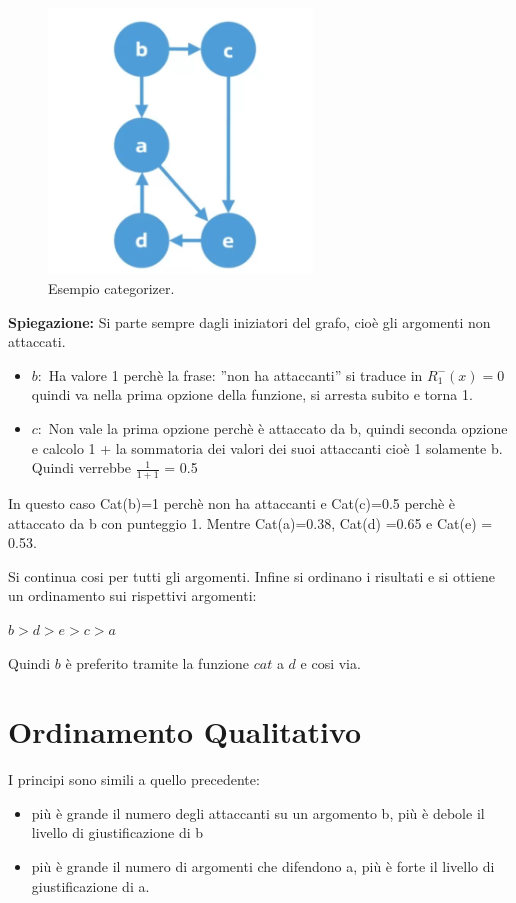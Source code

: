 \begin{figure}[htp]
	\centering
    \includegraphics[width=7cm, keepaspectratio]{img/Cap8/quantitativo2.png}
    \caption{Esempio categorizer.}
\end{figure}
\noindent \textbf{Spiegazione: } Si parte sempre dagli iniziatori del grafo, cioè gli argomenti non attaccati.
\begin{itemize}
    \item $b:$ Ha valore 1 perchè la frase: ”non ha attaccanti” si traduce in $R^-_1(x) = 0$ quindi va nella prima opzione della funzione, si arresta subito e torna 1.
    \item $c:$ Non vale la prima opzione perchè è attaccato da b, quindi seconda opzione e calcolo 1 + la sommatoria dei valori dei suoi attaccanti cioè 1 solamente b. Quindi verrebbe $\frac{1}{1+1}$ = 0.5
\end{itemize}
In questo caso Cat(b)=1 perchè non ha attaccanti e Cat(c)=0.5 perchè è attaccato da b con punteggio 1. Mentre Cat(a)=0.38, Cat(d) =0.65 e Cat(e) = 0.53.

\vspace{0.3cm}

Si continua cosi per tutti gli argomenti. Infine si ordinano i risultati e si ottiene un ordinamento sui rispettivi argomenti:
\begin{center}
    $b>d>e>c>a$
\end{center}
Quindi $b$ è preferito tramite la funzione $cat$ a $d$ e cosi via.
\section{Ordinamento Qualitativo}
I principi sono simili a quello precedente:
\begin{itemize}
    \item più è grande il numero degli attaccanti su un argomento b, più è debole il livello di giustificazione di b
    \item più è grande il numero di argomenti che difendono a, più è forte il livello di giustificazione di a.
\end{itemize}

